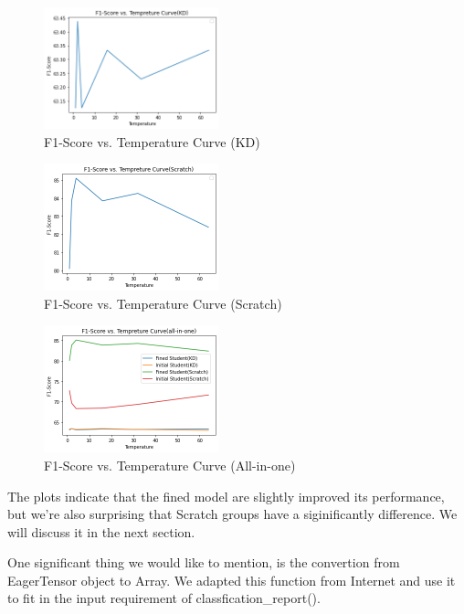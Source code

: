 \documentclass[conference]{IEEEtran}
\begin{document}
\begin{figure}[h] 
    \centering
    \includegraphics[width=0.45\textwidth]{./graphs/Task2/kd-f1.png}
    \caption{F1-Score vs. Temperature Curve (KD)}
    \label{kd-f1}
\end{figure}
\begin{figure}[h] 
    \centering
    \includegraphics[width=0.45\textwidth]{./graphs/Task2/nokd-f1.png}
    \caption{F1-Score vs. Temperature Curve (Scratch)}
    \label{nokd-f1}
\end{figure}
\begin{figure}[h] 
    \centering
    \includegraphics[width=0.45\textwidth]{./graphs/Task2/allinone-f1.png}
    \caption{F1-Score vs. Temperature Curve (All-in-one)}
    \label{allinone-f1}
\end{figure}

The plots indicate that the fined model are slightly improved its performance, but we're also surprising that Scratch groups have a siginificantly difference. We will discuss it in the next section.

One significant thing we would like to mention, is the convertion from EagerTensor object to Array. We adapted this function from Internet and use it to fit in the input requirement of classfication\_report().
\end{document}
